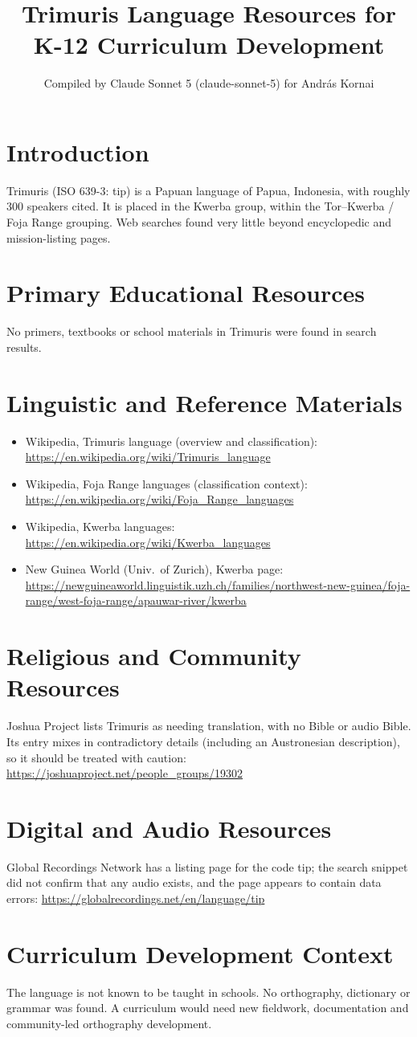 \documentclass[12pt]{article}
\title{Trimuris Language Resources for K-12 Curriculum Development}
\author{Compiled by Claude Sonnet 5 (claude-sonnet-5) for Andr\'as Kornai}
\date{}
\begin{document}
\maketitle

\section{Introduction}
Trimuris (ISO 639-3: tip) is a Papuan language of Papua, Indonesia, with roughly 300 speakers cited. It is placed in the Kwerba group, within the Tor--Kwerba / Foja Range grouping. Web searches found very little beyond encyclopedic and mission-listing pages.

\section{Primary Educational Resources}
No primers, textbooks or school materials in Trimuris were found in search results.

\section{Linguistic and Reference Materials}
\begin{itemize}
\item Wikipedia, Trimuris language (overview and classification): \url{https://en.wikipedia.org/wiki/Trimuris_language}
\item Wikipedia, Foja Range languages (classification context): \url{https://en.wikipedia.org/wiki/Foja_Range_languages}
\item Wikipedia, Kwerba languages: \url{https://en.wikipedia.org/wiki/Kwerba_languages}
\item New Guinea World (Univ.\ of Zurich), Kwerba page: \url{https://newguineaworld.linguistik.uzh.ch/families/northwest-new-guinea/foja-range/west-foja-range/apauwar-river/kwerba}
\end{itemize}

\section{Religious and Community Resources}
Joshua Project lists Trimuris as needing translation, with no Bible or audio Bible. Its entry mixes in contradictory details (including an Austronesian description), so it should be treated with caution: \url{https://joshuaproject.net/people_groups/19302}

\section{Digital and Audio Resources}
Global Recordings Network has a listing page for the code tip; the search snippet did not confirm that any audio exists, and the page appears to contain data errors: \url{https://globalrecordings.net/en/language/tip}

\section{Curriculum Development Context}
The language is not known to be taught in schools. No orthography, dictionary or grammar was found. A curriculum would need new fieldwork, documentation and community-led orthography development.
\end{document}
